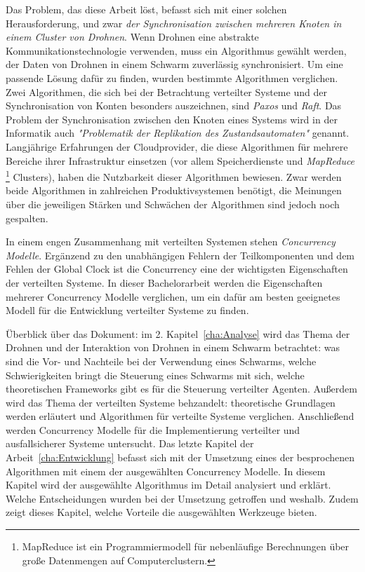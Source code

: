 Das Problem, das diese Arbeit löst, befasst sich mit einer solchen Herausforderung, und zwar \textit{der Synchronisation zwischen mehreren Knoten in einem Cluster von Drohnen}. Wenn Drohnen eine abstrakte Kommunikationstechnologie verwenden, muss ein Algorithmus gewählt werden, der Daten von Drohnen in einem Schwarm zuverlässig synchronisiert. Um eine passende Lösung dafür zu finden, wurden bestimmte Algorithmen verglichen. Zwei Algorithmen, die sich bei der Betrachtung verteilter Systeme und der Synchronisation von Konten besonders auszeichnen, sind \textit{Paxos} und \textit{Raft}. Das Problem der Synchronisation zwischen den Knoten eines Systems wird in der Informatik auch \textit{"Problematik der Replikation des Zustandsautomaten"} genannt. Langjährige Erfahrungen der Cloudprovider, die diese Algorithmen für mehrere Bereiche ihrer Infrastruktur einsetzen (vor allem Speicherdienste und \textit{MapReduce} \footnote{MapReduce ist ein Programmiermodell für nebenläufige Berechnungen über große Datenmengen auf Computerclustern.} Clusters), haben die Nutzbarkeit dieser Algorithmen bewiesen. Zwar werden beide Algorithmen in zahlreichen Produktivsystemen benötigt, die Meinungen über die jeweiligen Stärken und Schwächen der Algorithmen sind jedoch noch gespalten.

In einem engen Zusammenhang mit verteilten Systemen stehen \textit{Concurrency Modelle}. Ergänzend zu den unabhängigen Fehlern der Teilkomponenten und dem Fehlen der Global Clock ist die Concurrency eine der wichtigsten Eigenschaften der verteilten Systeme. In dieser Bachelorarbeit werden die Eigenschaften mehrerer Concurrency Modelle verglichen, um ein dafür am besten geeignetes Modell für die Entwicklung verteilter Systeme zu finden.

Überblick über das Dokument: im 2. Kapitel~\ref{cha:Analyse} wird das Thema der Drohnen und der Interaktion von Drohnen in einem Schwarm betrachtet: was sind die Vor- und Nachteile bei der Verwendung eines Schwarms, welche Schwierigkeiten bringt die Steuerung eines Schwarms mit sich, welche theoretischen Frameworks gibt es für die Steuerung verteilter Agenten. Außerdem wird das Thema der verteilten Systeme behzandelt: theoretische Grundlagen werden erläutert und Algorithmen für verteilte Systeme verglichen. Anschließend werden Concurrency Modelle für die Implementierung verteilter und ausfallsicherer Systeme untersucht. Das letzte Kapitel der Arbeit~\ref{cha:Entwicklung} befasst sich mit der Umsetzung eines der besprochenen Algorithmen mit einem der ausgewählten Concurrency Modelle. In diesem Kapitel wird der ausgewählte Algorithmus im Detail analysiert und erklärt. Welche Entscheidungen wurden bei der Umsetzung getroffen und weshalb. Zudem zeigt dieses Kapitel, welche Vorteile die ausgewählten Werkzeuge bieten.
